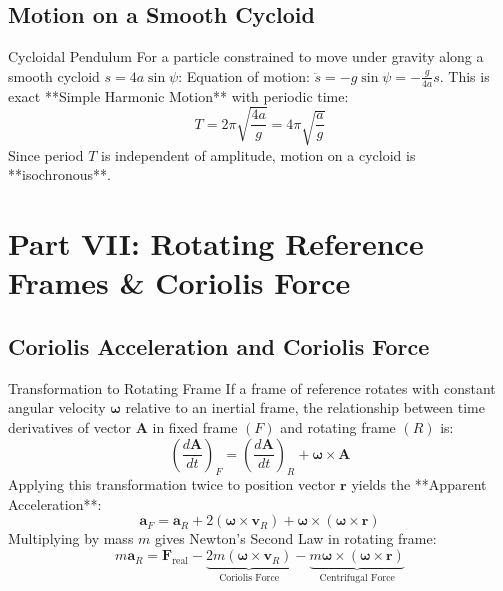 \documentclass[11pt,a4paper]{article}
\begin{document}
\subsection{Motion on a Smooth Cycloid}

\begin{theorembox}{Cycloidal Pendulum}
For a particle constrained to move under gravity along a smooth cycloid $s = 4a\sin\psi$:
Equation of motion: $\ddot{s} = -g\sin\psi = -\frac{g}{4a} s$.
This is exact **Simple Harmonic Motion** with periodic time:
\begin{equation}
T = 2\pi \sqrt{\frac{4a}{g}} = 4\pi \sqrt{\frac{a}{g}}
\end{equation}
Since period $T$ is independent of amplitude, motion on a cycloid is **isochronous**.
\end{theorembox}

\section{Part VII: Rotating Reference Frames \& Coriolis Force}

\subsection{Coriolis Acceleration and Coriolis Force}

\begin{theorembox}{Transformation to Rotating Frame}
If a frame of reference rotates with constant angular velocity $\boldsymbol{\omega}$ relative to an inertial frame, the relationship between time derivatives of vector $\mathbf{A}$ in fixed frame $(F)$ and rotating frame $(R)$ is:
\begin{equation}
\left(\frac{d\mathbf{A}}{dt}\right)_F = \left(\frac{d\mathbf{A}}{dt}\right)_R + \boldsymbol{\omega} \times \mathbf{A}
\end{equation}
Applying this transformation twice to position vector $\mathbf{r}$ yields the **Apparent Acceleration**:
\begin{equation}
\mathbf{a}_F = \mathbf{a}_R + 2(\boldsymbol{\omega} \times \mathbf{v}_R) + \boldsymbol{\omega} \times (\boldsymbol{\omega} \times \mathbf{r})
\end{equation}
Multiplying by mass $m$ gives Newton's Second Law in rotating frame:
\begin{equation}
m \mathbf{a}_R = \mathbf{F}_{\text{real}} - \underbrace{2m (\boldsymbol{\omega} \times \mathbf{v}_R)}_{\text{Coriolis Force}} - \underbrace{m \boldsymbol{\omega} \times (\boldsymbol{\omega} \times \mathbf{r})}_{\text{Centrifugal Force}}
\end{equation}
\end{theorembox}
\end{document}
